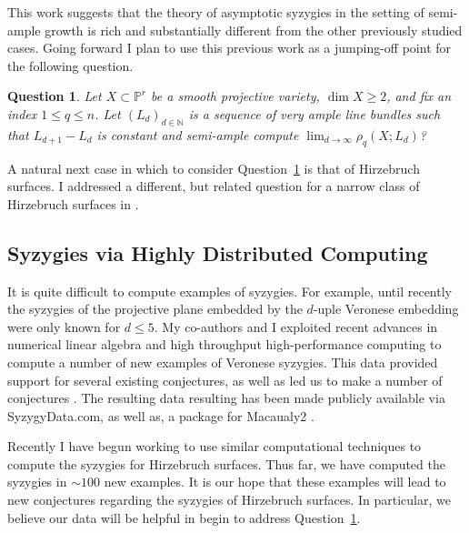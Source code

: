 \documentclass[11pt,reqno]{amsart}
\newtheorem{question}[lemma]{Question}
\theoremstyle{remark}
\newcommand{\N}{\mathbb{N}}
\renewcommand{\P}{\mathbb{P}}
\begin{document}
This work suggests that the theory of asymptotic syzygies in the setting of semi-ample growth is rich and substantially different from the other previously studied cases. Going forward I plan to use this previous work as a jumping-off point for the following question.  

\begin{question}\label{quest:semi-ample}
Let $X\subset \P^r$ be a smooth projective variety, $\dim X \geq2$, and fix an index $1\leq q \leq n$. Let $(L_{d})_{d\in\N}$ is a sequence of very ample line bundles such that $L_{d+1}-L_{d}$ is constant and semi-ample compute $\lim_{d\to\infty} \rho_{q}\left(X;L_{d}\right)$?
\end{question}

A natural next case in which to consider Question~\ref{quest:semi-ample} is that of Hirzebruch surfaces. I addressed a different, but related question for a narrow class of Hirzebruch surfaces in \cite{bruce19-hirzebruch}.

\subsection{Syzygies via Highly Distributed Computing}

It is quite difficult to compute examples of syzygies. For example, until recently the syzygies of the projective plane embedded by the $d$-uple Veronese embedding were only known for $d\leq 5$. My co-authors and I exploited recent advances in numerical linear algebra and high throughput high-performance computing to compute a number of new examples of Veronese syzygies. This data provided support for several existing conjectures, as well as led us to make a number of conjectures \cite{bruceErmanGoldsteinYang18}. 
The resulting data resulting has been made publicly available via SyzygyData.com, as well as, a package for Macaualy2 \cite{bruceErman19}.



Recently I have begun working to use similar computational techniques to compute the syzygies for Hirzebruch surfaces. Thus far, we have computed the syzygies in  $\sim100$ new examples. It is our hope that these examples will lead to new conjectures regarding the syzygies of Hirzebruch surfaces. In particular, we believe our data will be helpful in begin to address Question~\ref{quest:semi-ample}.
\end{document}
